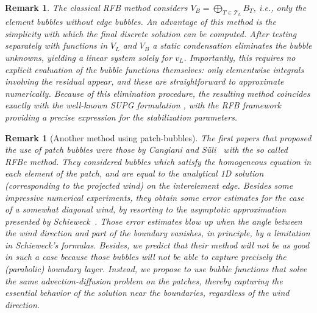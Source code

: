 \documentclass{article}
\newtheorem{rem}[thm]{Remark}
\newcommand{\T}{\ensuremath{\mathcal{T}}\xspace}
\begin{document}
    
\begin{rem}
\rm
The classical RFB method considers $V_B =\bigoplus_{T\in\T_h} B_T$, i.e., only the \emph{element bubbles} without \emph{edge bubbles}.
An advantage of this method is the simplicity with which the final discrete solution can be computed. After testing separately with functions in $V_L$ and $V_B$ a static condensation eliminates the bubble unknowns, yielding a linear system solely for $v_L$. Importantly, this requires no explicit evaluation of the bubble functions themselves: only elementwise integrals involving the residual appear, and these are straightforward to approximate numerically.
Because of this elimination procedure, the resulting method 
coincides exactly with the well-known SUPG formulation \cite{BFHR1997}, with the RFB framework providing a precise expression for the stabilization parameters.
\end{rem}
\begin{rem}[Another method using patch-bubbles]
\rm
The first papers that proposed the use of patch bubbles were those by Cangiani and S\"uli~\cite{Cangiani2005long,Cangiani2005short} with the so called RFBe method. They considered bubbles which satisfy the homogeneous equation in each element of the patch, and are equal to the analytical 1D solution (corresponding to the projected wind) on the interelement edge. Besides some impressive numerical experiments, they obtain some error estimates for the case of a somewhat diagonal wind, by resorting to the asymptotic approximation presented by Schieweck~\cite{thesisSchieweck}. Those error estimates blow up when the angle between the wind direction and part of the boundary vanishes, in principle, by a limitation in Schieweck's formulas.
Besides, we predict that their method will not be as good in such a case because those bubbles will not be able to capture precisely the (parabolic) boundary layer.
Instead, we propose to use bubble functions that solve the same advection-diffusion problem on the patches, thereby capturing the essential behavior of the solution near the boundaries, regardless of the wind direction.
\end{rem}
\end{document}
